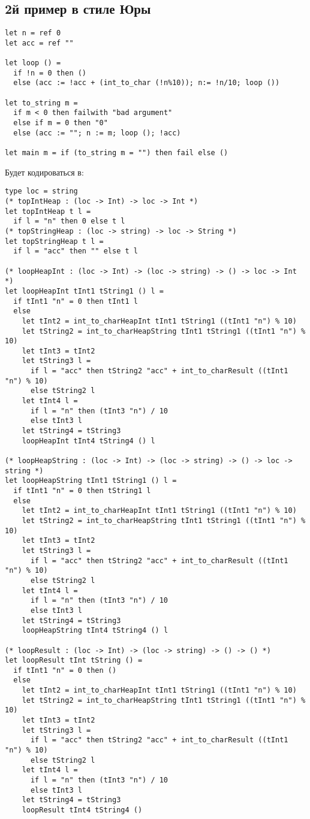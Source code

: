 \documentclass{article}
\begin{document}
\subsection{2й пример в стиле Юры}
\begin{verbatim}  
let n = ref 0
let acc = ref ""

let loop () = 
  if !n = 0 then ()
  else (acc := !acc + (int_to_char (!n%10)); n:= !n/10; loop ())

let to_string m = 
  if m < 0 then failwith "bad argument"
  else if m = 0 then "0"
  else (acc := ""; n := m; loop (); !acc)

let main m = if (to_string m = "") then fail else ()
\end{verbatim}
Будет кодироваться в:
\begin{verbatim}
type loc = string
(* topIntHeap : (loc -> Int) -> loc -> Int *)
let topIntHeap t l =
  if l = "n" then 0 else t l
(* topStringHeap : (loc -> string) -> loc -> String *)
let topStringHeap t l =
  if l = "acc" then "" else t l

(* loopHeapInt : (loc -> Int) -> (loc -> string) -> () -> loc -> Int *)
let loopHeapInt tInt1 tString1 () l =
  if tInt1 "n" = 0 then tInt1 l
  else
    let tInt2 = int_to_charHeapInt tInt1 tString1 ((tInt1 "n") % 10)
    let tString2 = int_to_charHeapString tInt1 tString1 ((tInt1 "n") % 10)
    let tInt3 = tInt2
    let tString3 l =
      if l = "acc" then tString2 "acc" + int_to_charResult ((tInt1 "n") % 10)
      else tString2 l
    let tInt4 l =
      if l = "n" then (tInt3 "n") / 10
      else tInt3 l
    let tString4 = tString3
    loopHeapInt tInt4 tString4 () l

(* loopHeapString : (loc -> Int) -> (loc -> string) -> () -> loc -> string *)
let loopHeapString tInt1 tString1 () l =
  if tInt1 "n" = 0 then tString1 l
  else
    let tInt2 = int_to_charHeapInt tInt1 tString1 ((tInt1 "n") % 10)
    let tString2 = int_to_charHeapString tInt1 tString1 ((tInt1 "n") % 10)
    let tInt3 = tInt2
    let tString3 l =
      if l = "acc" then tString2 "acc" + int_to_charResult ((tInt1 "n") % 10)
      else tString2 l
    let tInt4 l =
      if l = "n" then (tInt3 "n") / 10
      else tInt3 l
    let tString4 = tString3
    loopHeapString tInt4 tString4 () l

(* loopResult : (loc -> Int) -> (loc -> string) -> () -> () *)
let loopResult tInt tString () =
  if tInt1 "n" = 0 then ()
  else
    let tInt2 = int_to_charHeapInt tInt1 tString1 ((tInt1 "n") % 10)
    let tString2 = int_to_charHeapString tInt1 tString1 ((tInt1 "n") % 10)
    let tInt3 = tInt2
    let tString3 l =
      if l = "acc" then tString2 "acc" + int_to_charResult ((tInt1 "n") % 10)
      else tString2 l
    let tInt4 l =
      if l = "n" then (tInt3 "n") / 10
      else tInt3 l
    let tString4 = tString3
    loopResult tInt4 tString4 ()


\end{verbatim}
\end{document}
